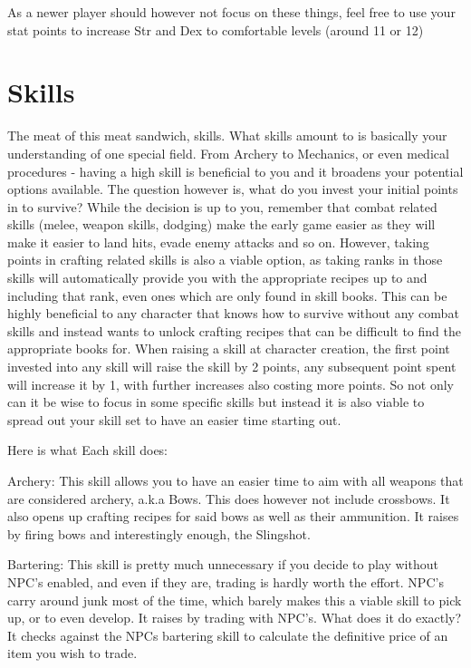 \documentclass[11pt]{report}
\begin{document}
As a newer player should however not focus on these things, feel free to use your stat points to increase Str and Dex to comfortable levels (around 11 or 12)

\section{Skills}

The meat of this meat sandwich, skills. What skills amount to is basically your understanding of one special field. From Archery to Mechanics, or even medical procedures - having a high skill is beneficial to you and it broadens your potential options available. The question however is, what do you invest your initial points in to survive? While the decision is up to you, remember that combat related skills (melee, weapon skills, dodging) make the early game easier as they will make it easier to land hits, evade enemy attacks and so on. However, taking points in crafting related skills is also a viable option, as taking ranks in those skills will automatically provide you with the appropriate recipes up to and including that rank, even ones which are only found in skill books. This can be highly beneficial to any character that knows how to survive without any combat skills and instead wants to unlock crafting recipes that can be difficult to find the appropriate books for. When raising a skill at character creation, the first point invested into any skill will raise the skill by 2 points, any subsequent point spent will increase it by 1, with further increases also costing more points. So not only can it be wise to focus in some specific skills but instead it is also viable to spread out your skill set to have an easier time starting out.

Here is what Each skill does:

Archery: This skill allows you to have an easier time to aim with all weapons that are considered archery, a.k.a Bows. This does however not include crossbows. It also opens up crafting recipes for said bows as well as their ammunition. It raises by firing bows and interestingly enough, the Slingshot.

Bartering: This skill is pretty much unnecessary if you decide to play without NPC's enabled, and even if they are, trading is hardly worth the effort. NPC's carry around junk most of the time, which barely makes this a viable skill to pick up, or to even develop. It raises by trading with NPC's. What does it do exactly? It checks against the NPCs bartering skill to calculate the definitive price of an item you wish to trade.
\end{document}
